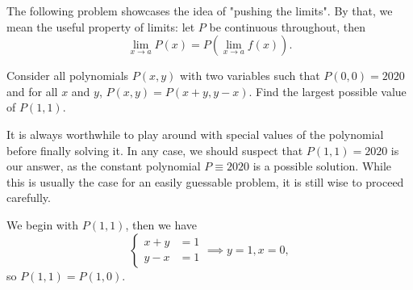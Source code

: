 \documentclass[../jarvis.tex]{subfiles}
\begin{document}
The following problem showcases the idea of "pushing the limits". By that, we mean the useful property of limits: let $P$ be continuous throughout, then
$$\lim_{x\to a}P(x)=P\left(\lim_{x\to a}f(x)\right).$$

\begin{example}[2021 SMO(O) P6]
    Consider all polynomials $P(x,y)$ with two variables such that $P(0,0)=2020$ and for all $x$ and $y$, $P(x,y)=P(x+y,y-x)$. Find the largest possible value of $P(1,1)$.
\end{example}
It is always worthwhile to play around with special values of the polynomial before finally solving it. In any case, we should suspect that $P(1,1)=2020$ is our answer, as the constant polynomial $P\equiv 2020$ is a possible solution. While this is usually the case for an easily guessable problem, it is still wise to proceed carefully.

We begin with $P(1,1)$, then we have
$$\begin{cases}
    x+y&=1 \\
    y-x&=1
\end{cases} \implies y=1,x=0,$$ so $P(1,1)=P(1,0)$.
\end{document}

